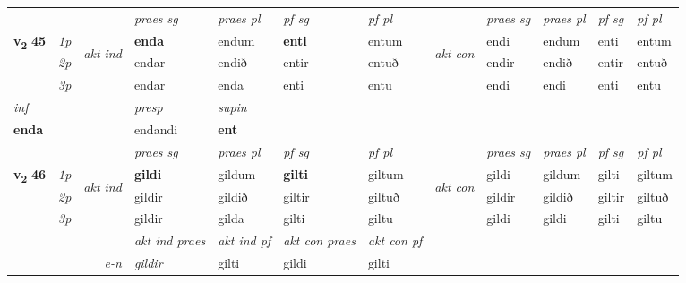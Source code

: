 \begin{longtable}[l]{X>{\footnotesize\itshape}llXXXXlXXXX}
 & &   & \textit{praes sg}  & \textit{praes pl}    & \textit{ pf sg} & \textit{pf pl} & & \textit{praes sg}  & \textit{praes pl}    & \textit{pf sg} & \textit{pf pl }  \\ \cmidrule{4-7} \cmidrule{9-12}
 \multirow{2}{*}{{{\textbf{v{\textsubscript{2}}} \Large{\textbf{45}}}}}  & 1p & \multirow{3}{*}{\begin{turn}{90}\textit{akt ind}\end{turn}} & \textbf{enda} & endum & \textbf{enti} & entum & \multirow{3}{*}{\begin{turn}{90}\textit{akt con}\end{turn}} &endi & endum & enti & entum\\*
 & 2p &  &  endar  & endið & entir & entuð & & endir & endið & entir & entuð \\*
 & 3p &  & endar & enda & enti & entu & & endi & endi& enti & entu \\*
\cmidrule{4-7} \cmidrule{9-12}

   {\textit{inf}} & &     & \textit{presp} & \textit{supin}   \\*
  {\textbf{enda}} & &     & endandi &  \textbf{ent}   \\*

\midrule

 & &   & \textit{praes sg}  & \textit{praes pl}    & \textit{ pf sg} & \textit{pf pl} & & \textit{praes sg}  & \textit{praes pl}    & \textit{pf sg} & \textit{pf pl }  \\ \cmidrule{4-7} \cmidrule{9-12}
 \multirow{2}{*}{{{\textbf{v{\textsubscript{2}}} \Large{\textbf{46}}}}}  & 1p & \multirow{3}{*}{\begin{turn}{90}\textit{akt ind}\end{turn}} & \textbf{gildi} & gildum & \textbf{gilti} & giltum & \multirow{3}{*}{\begin{turn}{90}\textit{akt con}\end{turn}} &gildi & gildum & gilti & giltum\\*
 & 2p &  &  gildir  & gildið & giltir & giltuð & & gildir & gildið & giltir & giltuð \\*
 & 3p &  & gildir & gilda & gilti & giltu & & gildi & gildi& gilti & giltu \\*
\cmidrule{4-7} \cmidrule{9-12}

   && &  \textit{akt ind praes} & \textit{akt ind pf} & \textit{akt con praes} & \textit{akt con pf} \\*
\multicolumn{3}{r}{\textit{e-n}} & gildir & gilti & gildi & gilti \\*


\end{longtable}

